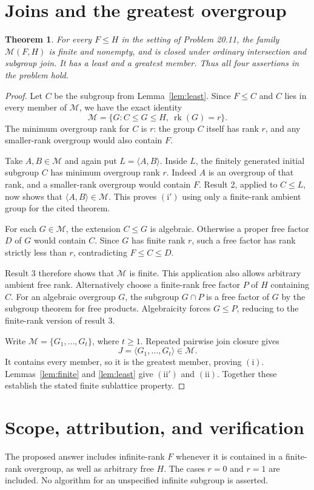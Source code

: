 \documentclass[11pt,a4paper]{article}
\newtheorem{theorem}{Theorem}
\theoremstyle{remark}\newtheorem*{remark}{Remark}
\newcommand{\rk}{\operatorname{rk}}
\newcommand{\M}{\mathcal M}
\newcommand{\gen}[1]{\langle #1\rangle}
\begin{document}
\section{Joins and the greatest overgroup}
\begin{theorem}\label{thm:main}
For every $F\le H$ in the setting of Problem 20.11, the family $\M(F,H)$ is finite and nonempty, and is closed under ordinary intersection and subgroup join. It has a least and a greatest member. Thus all four assertions in the problem hold.
\end{theorem}
\begin{proof}
Let $C$ be the subgroup from Lemma~\ref{lem:least}. Since $F\le C$ and $C$ lies in every member of $\M$, we have the exact identity
\[
\M=\{G:C\le G\le H,\ \rk(G)=r\}.
\]
The minimum overgroup rank for $C$ is $r$: the group $C$ itself has rank $r$, and any smaller-rank overgroup would also contain $F$.

Take $A,B\in\M$ and again put $L=\gen{A,B}$. Inside $L$, the finitely generated initial subgroup $C$ has minimum overgroup rank $r$. Indeed $A$ is an overgroup of that rank, and a smaller-rank overgroup would contain $F$. Result 2, applied to $C\le L$, now shows that $\gen{A,B}\in\M$. This proves $(\mathrm{i}')$ using only a finite-rank ambient group for the cited theorem.

For each $G\in\M$, the extension $C\le G$ is algebraic. Otherwise a proper free factor $D$ of $G$ would contain $C$. Since $G$ has finite rank $r$, such a free factor has rank strictly less than $r$, contradicting $F\le C\le D$.

Result 3 therefore shows that $\M$ is finite. This application also allows arbitrary ambient free rank. Alternatively choose a finite-rank free factor $P$ of $H$ containing $C$. For an algebraic overgroup $G$, the subgroup $G\cap P$ is a free factor of $G$ by the subgroup theorem for free products. Algebraicity forces $G\le P$, reducing to the finite-rank version of result 3.

Write $\M=\{G_1,\ldots,G_t\}$, where $t\ge1$. Repeated pairwise join closure gives
\[
J=\gen{G_1,\ldots,G_t}\in\M.
\]
It contains every member, so it is the greatest member, proving $(\mathrm{i})$. Lemmas~\ref{lem:finite} and \ref{lem:least} give $(\mathrm{ii}')$ and $(\mathrm{ii})$. Together these establish the stated finite sublattice property.
\end{proof}

\section{Scope, attribution, and verification}
The proposed answer includes infinite-rank $F$ whenever it is contained in a finite-rank overgroup, as well as arbitrary free $H$. The cases $r=0$ and $r=1$ are included. No algorithm for an unspecified infinite subgroup is asserted.
\end{document}
